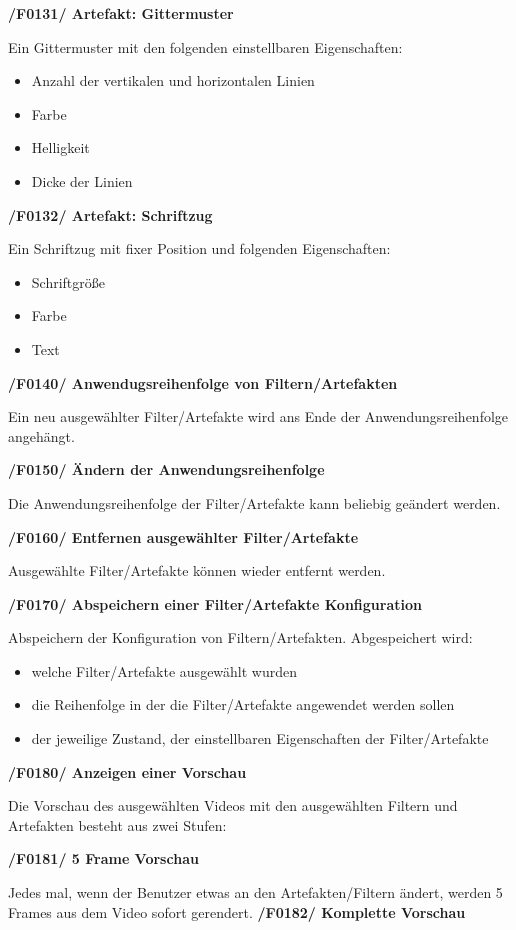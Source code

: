 \documentclass[parskip=full]{scrartcl}
\begin{document}
\textbf{/F0131/ Artefakt: Gittermuster}

Ein Gittermuster mit den folgenden einstellbaren Eigenschaften:
\begin{itemize}
\item Anzahl der vertikalen und horizontalen Linien
\item Farbe
\item Helligkeit
\item Dicke der Linien
\end{itemize}
\newpage
\textbf{/F0132/ Artefakt: Schriftzug}

Ein Schriftzug mit fixer Position und folgenden Eigenschaften:
\begin{itemize}
\item Schriftgröße
\item Farbe
\item Text
\end{itemize}

\textbf{/F0140/ Anwendugsreihenfolge von Filtern/Artefakten}

Ein neu ausgewählter Filter/Artefakte wird ans Ende der Anwendungsreihenfolge angehängt.

\textbf{/F0150/ Ändern der Anwendungsreihenfolge}

Die Anwendungsreihenfolge der Filter/Artefakte kann beliebig geändert werden.

\textbf{/F0160/ Entfernen ausgewählter Filter/Artefakte}

Ausgewählte Filter/Artefakte können wieder entfernt werden.

\textbf{/F0170/ Abspeichern einer Filter/Artefakte Konfiguration}

Abspeichern der Konfiguration von Filtern/Artefakten. Abgespeichert wird:
\begin{itemize}
\item welche Filter/Artefakte ausgewählt wurden
\item die Reihenfolge in der die Filter/Artefakte angewendet werden sollen
\item der jeweilige Zustand, der einstellbaren Eigenschaften der Filter/Artefakte
\end{itemize}

\textbf{/F0180/ Anzeigen einer Vorschau}

Die Vorschau des ausgewählten Videos mit den ausgewählten Filtern und Artefakten besteht aus zwei Stufen:

\textbf{/F0181/ 5 Frame Vorschau}

Jedes mal, wenn der Benutzer etwas an den Artefakten/Filtern ändert, werden 5 Frames aus dem Video sofort gerendert.
\newpage
\textbf{/F0182/ Komplette Vorschau}
\end{document}
